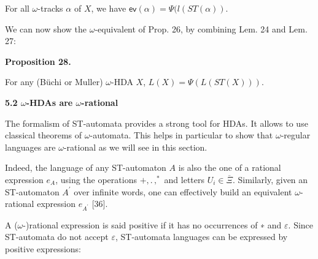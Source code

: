 \documentclass[10pt,a4paper]{article}
\begin{document}
For all $\omega$-tracks $\alpha$ of $X$, we have $\mathsf{ev}(\alpha)=\Psi(l(ST(\alpha))$.\par
 
 
 
 
We can now show the $\omega$-equivalent of Prop. 26, by combining Lem. 24 and Lem. 27:\par
 
 
 
\par\medskip\noindent\textbf{Proposition 28.}\par
 
 
For any (Büchi or Muller) $\omega$-HDA $X$, $L(X)=\Psi(L(ST(X)))$.\par
 
 
 
 
 
\par\medskip\noindent\textbf{5.2 $\omega$-HDAs are $\omega$-rational}\par
 
 
The formalism of ST-automata provides a strong tool for HDAs. It allows to use classical theorems of $\omega$-automata. This helps in particular to show that $\omega$-regular languages are $\omega$-rational as we will see in this section.\par
 
 
 
Indeed, the language of any ST-automaton $A$ is also the one of a rational expression $e_{A}$, using the operations $+,.\,,^{*}$ and letters $U_{i}\in\overline{\Xi}$. Similarly, given an ST-automaton $A^{\prime}$ over infinite words, one can effectively build an equivalent $\omega$-rational expression $e_{A^{\prime}}$ [36].\par
 
 
 
A ($\omega$-)rational expression is said positive if it has no occurrences of ∗ and $\varepsilon$. Since ST-automata do not accept $\varepsilon$, ST-automata languages can be expressed by positive expressions:\par
 
\end{document}

